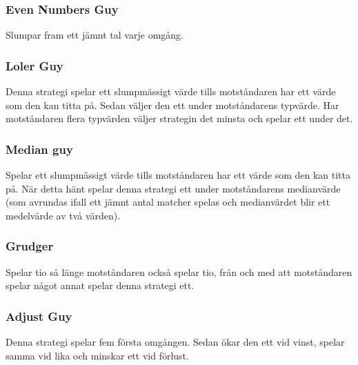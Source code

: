\subsubsection{Even Numbers Guy}
Slumpar fram ett jämnt tal varje omgång.

\subsubsection{Loler Guy}
Denna strategi spelar ett slumpmässigt värde tills motståndaren har ett värde som den kan titta på. Sedan väljer den ett under motståndarens typvärde. Har motståndaren flera typvärden väljer strategin det minsta och spelar ett under det.

\subsubsection{Median guy}
Spelar ett slumpmässigt värde tills motståndaren har ett värde som den kan titta på. När detta hänt spelar denna strategi ett under motståndarens medianvärde (som avrundas ifall ett jämnt antal matcher spelas och medianvärdet blir ett medelvärde av två värden).

\subsubsection{Grudger}
Spelar tio så länge motståndaren också spelar tio, från och med att motståndaren spelar något annat spelar denna strategi ett.

\subsubsection{Adjust Guy}
Denna strategi spelar fem första omgången. Sedan ökar den ett vid vinst, spelar samma vid lika och minskar ett vid förlust.